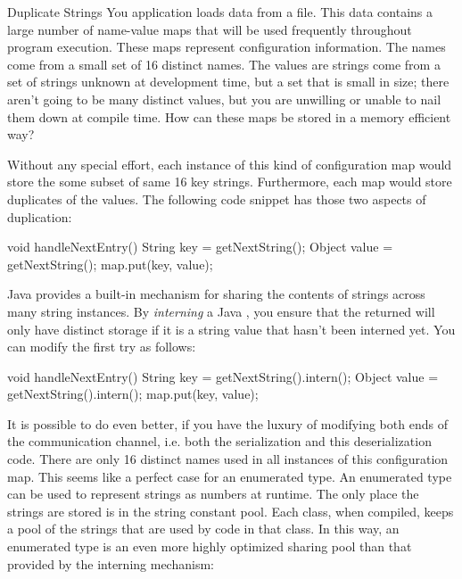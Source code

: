 \begin{example}{Duplicate Strings}
You application loads data from a file. This data contains a large number of
name-value maps that will be used frequently throughout program execution.
These maps represent configuration information. The names come from a small set
of 16 distinct names. The values are strings come from
a set of strings unknown at development time, but a set that is small in size;
there aren't going to be many distinct values, but you are unwilling or unable
to nail them down at compile time. How can these maps be stored in a memory
efficient way?
\end{example}

Without any special effort, each instance of this kind of configuration map
would store the some subset of same 16 key strings. Furthermore, each map would
store duplicates of the values. The following code snippet has those two
aspects of duplication:

\begin{shortlisting}
void handleNextEntry() {
	String key = getNextString();
	Object value = getNextString();
	map.put(key, value);
}
\end{shortlisting} 

Java provides a built-in mechanism for sharing the contents of strings across
many string instances. By \emph{interning} a Java
, you ensure that the returned  will only have
distinct storage if it is a string value that hasn't been interned yet. You can
modify the first try as follows:

\begin{shortlisting}
void handleNextEntry() {
	String key = getNextString().intern();
	Object value = getNextString().intern();
	map.put(key, value);
}
\end{shortlisting} 

It is possible to do even better, if you have the luxury of modifying both ends
of the communication channel, i.e. both the serialization and this
deserialization code. There are only 16 distinct names used in all instances of
this configuration map. This seems like a perfect case for an enumerated type.
An enumerated type can be used to represent strings as numbers at runtime. The
only place the strings are stored is in the string constant pool. Each class, when compiled, keeps a pool of the strings that
are used by code in that class. In this way, an enumerated type is an even more
highly optimized sharing pool than that provided by the interning mechanism:

